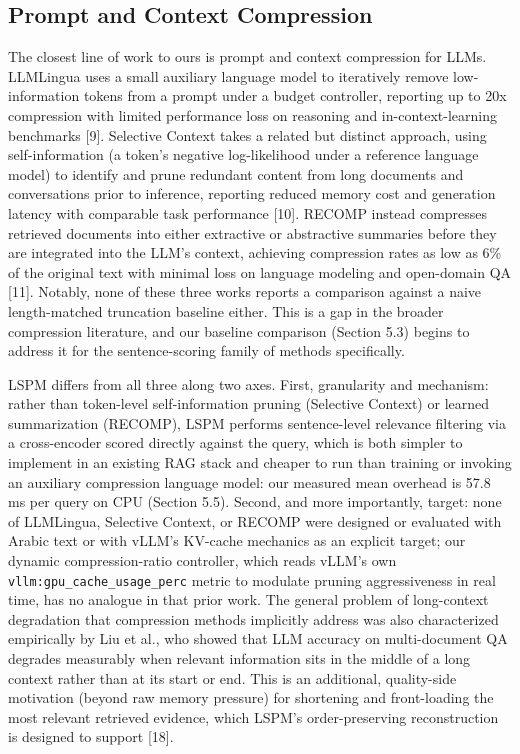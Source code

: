 \documentclass[pdflatex,sn-basic,Numbered]{sn-jnl}
\begin{document}
\subsection{Prompt and Context Compression}
The closest line of work to ours is prompt and context compression for LLMs. LLMLingua uses a small auxiliary language model to iteratively remove low-information tokens from a prompt under a budget controller, reporting up to 20x compression with limited performance loss on reasoning and in-context-learning benchmarks [9]. Selective Context takes a related but distinct approach, using self-information (a token's negative log-likelihood under a reference language model) to identify and prune redundant content from long documents and conversations prior to inference, reporting reduced memory cost and generation latency with comparable task performance [10]. RECOMP instead compresses retrieved documents into either extractive or abstractive summaries before they are integrated into the LLM's context, achieving compression rates as low as 6\% of the original text with minimal loss on language modeling and open-domain QA [11]. Notably, none of these three works reports a comparison against a naive length-matched truncation baseline either. This is a gap in the broader compression literature, and our baseline comparison (Section 5.3) begins to address it for the sentence-scoring family of methods specifically.

LSPM differs from all three along two axes. First, granularity and mechanism: rather than token-level self-information pruning (Selective Context) or learned summarization (RECOMP), LSPM performs sentence-level relevance filtering via a cross-encoder scored directly against the query, which is both simpler to implement in an existing RAG stack and cheaper to run than training or invoking an auxiliary compression language model: our measured mean overhead is 57.8 ms per query on CPU (Section 5.5). Second, and more importantly, target: none of LLMLingua, Selective Context, or RECOMP were designed or evaluated with Arabic text or with vLLM's KV-cache mechanics as an explicit target; our dynamic compression-ratio controller, which reads vLLM's own \texttt{vllm:gpu\_cache\_usage\_perc} metric to modulate pruning aggressiveness in real time, has no analogue in that prior work. The general problem of long-context degradation that compression methods implicitly address was also characterized empirically by Liu et al., who showed that LLM accuracy on multi-document QA degrades measurably when relevant information sits in the middle of a long context rather than at its start or end. This is an additional, quality-side motivation (beyond raw memory pressure) for shortening and front-loading the most relevant retrieved evidence, which LSPM's order-preserving reconstruction is designed to support [18].
\end{document}
